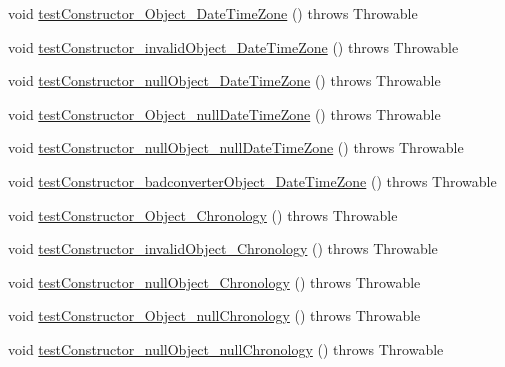 \begin{DoxyCompactItemize}
\item 
void \hyperlink{classorg_1_1joda_1_1time_1_1_test_date_time___constructors_ac9486b305491e4f667851276a94a0a39}{test\-Constructor\-\_\-\-Object\-\_\-\-Date\-Time\-Zone} ()  throws Throwable 
\item 
void \hyperlink{classorg_1_1joda_1_1time_1_1_test_date_time___constructors_ac5286b86e676528b154544342f23463e}{test\-Constructor\-\_\-invalid\-Object\-\_\-\-Date\-Time\-Zone} ()  throws Throwable 
\item 
void \hyperlink{classorg_1_1joda_1_1time_1_1_test_date_time___constructors_afda7bc4eb1569dab187aab8b53ef3501}{test\-Constructor\-\_\-null\-Object\-\_\-\-Date\-Time\-Zone} ()  throws Throwable 
\item 
void \hyperlink{classorg_1_1joda_1_1time_1_1_test_date_time___constructors_a5ee55ffc5656f36df829f673dc6265e0}{test\-Constructor\-\_\-\-Object\-\_\-null\-Date\-Time\-Zone} ()  throws Throwable 
\item 
void \hyperlink{classorg_1_1joda_1_1time_1_1_test_date_time___constructors_a7113d2720317da8d730c02d7d5dc2f72}{test\-Constructor\-\_\-null\-Object\-\_\-null\-Date\-Time\-Zone} ()  throws Throwable 
\item 
void \hyperlink{classorg_1_1joda_1_1time_1_1_test_date_time___constructors_a52a452ae210f5af507b06d70a3fbd3dd}{test\-Constructor\-\_\-badconverter\-Object\-\_\-\-Date\-Time\-Zone} ()  throws Throwable 
\item 
void \hyperlink{classorg_1_1joda_1_1time_1_1_test_date_time___constructors_a2997f71ea965db046819af748aac7807}{test\-Constructor\-\_\-\-Object\-\_\-\-Chronology} ()  throws Throwable 
\item 
void \hyperlink{classorg_1_1joda_1_1time_1_1_test_date_time___constructors_ab11cf81de7c45f5ba69ab2eec785cbd3}{test\-Constructor\-\_\-invalid\-Object\-\_\-\-Chronology} ()  throws Throwable 
\item 
void \hyperlink{classorg_1_1joda_1_1time_1_1_test_date_time___constructors_a43df353e1173b9d2846ee341b4c603eb}{test\-Constructor\-\_\-null\-Object\-\_\-\-Chronology} ()  throws Throwable 
\item 
void \hyperlink{classorg_1_1joda_1_1time_1_1_test_date_time___constructors_a1adc1284bdb5025b266bd2870b005d32}{test\-Constructor\-\_\-\-Object\-\_\-null\-Chronology} ()  throws Throwable 
\item 
void \hyperlink{classorg_1_1joda_1_1time_1_1_test_date_time___constructors_a58ed293fe92c10698e0f406b62625975}{test\-Constructor\-\_\-null\-Object\-\_\-null\-Chronology} ()  throws Throwable 

\end{DoxyCompactItemize}
